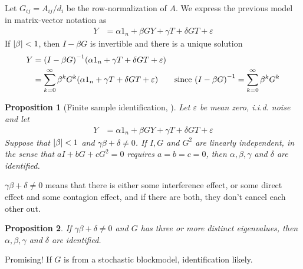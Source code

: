 \documentclass[aspectratio=169]{beamer}
\newtheorem{proposition}{Proposition}
\theoremstyle{remark}
\begin{document}
\begin{frame}
    Let $G_{ij} = A_{ij} / d_i$ be the row-normalization of $A$. We express the previous model in matrix-vector notation as
    \begin{align*}
        Y & = \alpha 1_n + \beta G Y + \gamma T + \delta G T + \varepsilon
    \end{align*}
    If $\lvert\beta\rvert < 1$, then $I - \beta G$ is invertible and there is a unique solution 
    \begin{align*}
        Y & = \paren*{I - \beta G}^{-1} \paren*{\alpha 1_n + \gamma T + \delta G T + \varepsilon}                                                                                \\
          & = \sum_{k=0}^\infty \beta^k G^k \paren*{\alpha 1_n + \gamma T + \delta G T + \varepsilon} & \text{since } \paren*{I - \beta G}^{-1} = \sum_{k=0}^\infty \beta^k G^k
    \end{align*}
\end{frame}

\begin{frame}
    \begin{proposition}[Finite sample identification, \cite{bramoulle2009}]
        Let $\varepsilon$ be mean zero, i.i.d. noise and let
        \begin{align*}
            Y & = \alpha 1_n + \beta G Y + \gamma T + \delta G T + \varepsilon                        
        \end{align*}
        Suppose that $\lvert\beta\rvert < 1$ and $\gamma \beta + \delta \neq 0$. If $I, G$ and $G^2$ are linearly independent, in the sense that $a I + b G + c G^2 = 0$ requires $a = b = c = 0$, then $\alpha, \beta, \gamma$ and $\delta$ are identified.
    \end{proposition}
    
    $\gamma \beta + \delta \neq 0$ means that there is either some interference effect, or some direct effect and some contagion effect, and if there are both, they don't cancel each other out.
\end{frame}

\begin{frame}
    \begin{proposition}
        If $\gamma \beta + \delta \neq 0$ and $G$ has three or more distinct eigenvalues, then $\alpha, \beta, \gamma$ and $\delta$ are identified.
    \end{proposition}
    
    Promising! If $G$ is from a stochastic blockmodel, identification likely.
\end{frame}
\end{document}

